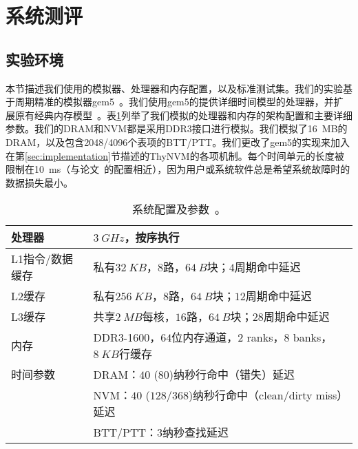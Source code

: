 \section{系统测评}
\label{sec:thynvm-eval}

\subsection{实验环境}

本节描述我们使用的模拟器、处理器和内存配置，以及标准测试集。我们的实验基于周期精准的模拟器gem5~\cite{Binkert:2011:GS:2024716.2024718}。我们使用gem5的提供详细时间模型的处理器，并扩展原有经典内存模型~\cite{6844484}。表\ref{table:config}列举了我们模拟的处理器和内存的架构配置和主要详细参数。我们的DRAM和NVM都是采用DDR3接口进行模拟。我们模拟了16~MB的DRAM，以及包含2048/4096个表项的BTT/PTT。我们更改了gem5的实现来加入在第\ref{sec:implementation}节描述的ThyNVM的各项机制。每个时间单元的长度被限制在10~ms（与论文~\cite{1003567, 1003568}的配置相近），因为用户或系统软件总是希望系统故障时的数据损失最小。 

\begin{table}[!h]
\centering
\caption{系统配置及参数~\cite{Lee:2009:APC:1555754.1555758}。}
\label{table:config}
\begin{tabular}{l|l}
\toprule[1.5pt]
处理器 & $3~GHz$，按序执行 \\
\hline
L1指令/数据缓存 & 私有$32~KB$，$8$路，$64~B$块；$4$周期命中延迟 \\
L2缓存 & 私有$256~KB$，$8$路，$64~B$块；$12$周期命中延迟 \\
L3缓存 & 共享$2~MB$每核，$16$路，$64~B$块；$28$周期命中延迟 \\
\hline
内存 & DDR3-1600，$64$位内存通道，$2$ ranks，$8$ banks，$8~KB$行缓存 \\
时间参数 & DRAM：$40$ ($80$)纳秒行命中（错失）延迟 \\
               & NVM：$40$ ($128$/$368$)纳秒行命中（clean/dirty miss）延迟 \\
               & BTT/PTT：$3$纳秒查找延迟 \\
\toprule[1.5pt]
\end{tabular}
\end{table}

